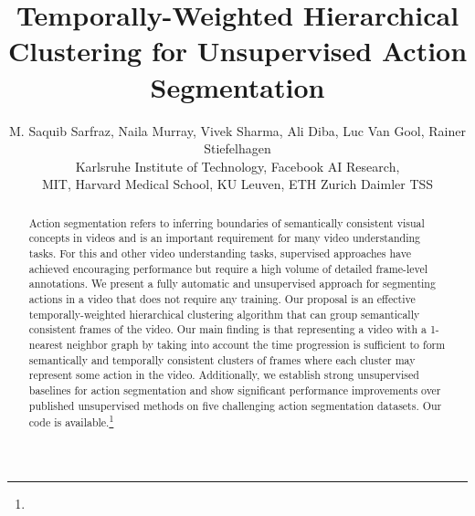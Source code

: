 \documentclass[10pt,twocolumn,letterpaper]{article}
\begin{document}
\iffalse
\title{Unsupervised Temporal Segmentation via Time-weighted Clustering}
\title{Unsupervised Segmentation of Complex Activities in Videos with Hierarchical Time-weighted Clustering}
\title{Unsupervised Segmentation of Actions in Untrimmed Videos with Hierarchical Time-weighted Clustering}
\title{Unsupervised Action Segmentation \& Alignment in Untrimmed Videos with Hierarchical Time-weighted Clustering}
\title{Unsupervised Action Segmentation in Untrimmed Videos with Hierarchical Time-weighted Clustering}
\title{Unsupervised Temporal Segmentation of Actions in Untrimmed Videos with Hierarchical Time-weighted Clustering}
\title{Hierarchical Time-weighted Clustering for Unsupervised Action Segmentation}
\fi
\title{Temporally-Weighted Hierarchical Clustering for Unsupervised Action Segmentation}


\author{M. Saquib Sarfraz,  Naila Murray, Vivek Sharma, Ali Diba,  Luc Van Gool, Rainer Stiefelhagen \\
\small{ Karlsruhe Institute of Technology,
 Facebook AI Research,}\\
\small{ MIT,
 Harvard Medical School,
 KU Leuven,
 ETH Zurich
 Daimler TSS}
}
\maketitle


\begin{abstract}
 Action segmentation refers to inferring boundaries of semantically consistent visual concepts in videos and is an important requirement for many video understanding tasks. 
 For this and other video understanding tasks, supervised approaches have achieved encouraging performance but require a high volume of detailed frame-level annotations. We present a fully automatic and unsupervised approach for segmenting actions in a video that does not require any training. Our proposal is an effective temporally-weighted hierarchical clustering algorithm that can group semantically consistent frames of the video. Our main finding is that representing a video with a 1-nearest neighbor graph by taking into account the time progression is sufficient to form semantically and temporally consistent clusters of frames where each cluster may represent some action in the video. Additionally, we establish strong unsupervised baselines for action segmentation and show significant performance improvements over published unsupervised methods on five challenging action segmentation datasets.
Our code is available.\footnote{}
 


\end{abstract}
\end{document}
